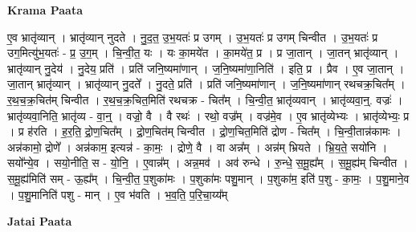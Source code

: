 \documentclass[17pt]{extarticle}
\begin{document}
\textbf{Krama Paata} \newline

ए॒व भ्रातृ॑व्यान् । भ्रातृ॑व्यान् नुदते । नु॒द॒त॒ उ॒भ॒यतः॑ प्र उगम् । उ॒भ॒यतः॑ प्र उगम् चिन्वीत । उ॒भ॒यतः॑ 
प्र उग॒मित्यु॑भ॒यतः॑ - प्र॒ उ॒ग॒म् । चि॒न्वी॒त॒ यः । यः का॒मये॑त । का॒मये॑त॒ प्र । प्र जा॒तान् । जा॒तन् भ्रातृ॑व्यान् । भ्रातृ॑व्यान् नु॒देय॑ । नु॒देय॒ प्रति॑ । प्रति॑ जनि॒ष्यमा॑णान् । ज॒नि॒ष्यमा॑णा॒निति॑ । इति॒ प्र । प्रैव । ए॒व जा॒तान् । जा॒तान् भ्रातृ॑व्यान् । भ्रातृ॑व्यान् नु॒दते᳚ । नु॒दते॒ प्रति॑ । प्रति॑ जनि॒ष्यमा॑णान् । ज॒नि॒ष्यमा॑णान् रथचक्र॒चित᳚म् । र॒थ॒च॒क्र॒चित॑म् चिन्वीत । र॒थ॒च॒क्र॒चित॒मिति॑ रथचक्र - चित᳚म् । चि॒न्वी॒त॒ भ्रातृ॑व्यवान् । भ्रातृ॑व्यवा॒न्॒. वज्रः॑ । भ्रातृ॑व्यवा॒निति॒ भ्रातृ॑व्य - वा॒न्॒ । वज्रो॒ वै । वै रथः॑ । रथो॒ वज्र᳚म् । वज्र॑मे॒व । ए॒व भ्रातृ॑व्येभ्यः । भ्रातृ॑व्येभ्यः॒ प्र । प्र ह॑रति । ह॒र॒ति॒ द्रो॒ण॒चित᳚म् । द्रो॒ण॒चित॑म् चिन्वीत । द्रो॒ण॒चित॒मिति॑ द्रोण - चित᳚म् । चि॒न्वी॒तान्न॑कामः । अन्न॑कामो॒ द्रोणे᳚ । अन्न॑काम॒ इत्यन्न॑ - का॒मः॒ । द्रोणे॒ वै । वा अन्न᳚म् । अन्न॑म् भ्रियते । भ्रि॒य॒ते॒ सयो॑नि । सयो᳚न्ये॒व । सयो॒नीति॒ स - यो॒नि॒ । ए॒वान्न᳚म् । अन्न॒मव॑ । अव॑ रुन्धे । रु॒न्धे॒ स॒मू॒ह्य᳚म् । स॒मू॒ह्य॑म् चिन्वीत । स॒मू॒ह्य॑मिति॑ सम् - ऊ॒ह्य᳚म् । चि॒न्वी॒त॒ प॒शुका॑मः । प॒शुका॑मः पशु॒मान् । प॒शुका॑म॒ इति॑ प॒शु - का॒मः॒ । प॒शु॒माने॒व । प॒शु॒मानिति॑ पशु - मान् । ए॒व भ॑वति । भ॒व॒ति॒ प॒रि॒चा॒य्य᳚म् \newline

\textbf{Jatai Paata} \newline
\end{document}
